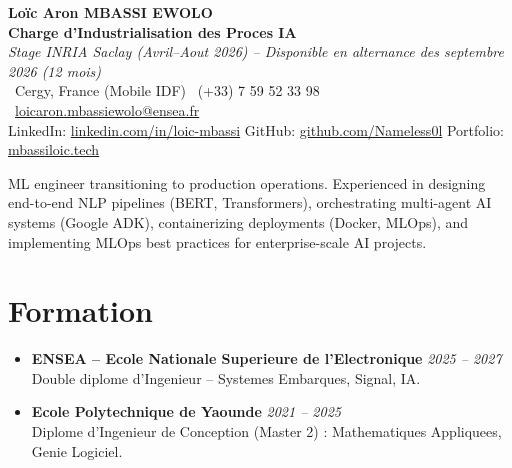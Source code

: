 \documentclass[a4paper,11pt]{article}
\begin{document}
\begin{center}
    {\Large \textbf{Lo\"ic Aron MBASSI EWOLO}} \\ \vspace{4pt}
    \textbf{\large Charge d'Industrialisation des Proces IA} \\
    \textit{\small Stage INRIA Saclay (Avril--Aout 2026) -- Disponible en alternance des septembre 2026 (12 mois)} \\ \vspace{4pt}
    \small
    \Pointinghand\ Cergy, France (Mobile IDF) \quad
    \Mobilefone\ (+33) 7 59 52 33 98 \quad
    {\color{primary}\Letter\ \href{mailto:loicaron.mbassiewolo@ensea.fr}{loicaron.mbassiewolo@ensea.fr}} \\ \vspace{2pt}
    {\color{primary}LinkedIn: \href{https://www.linkedin.com/in/loic-mbassi/}{linkedin.com/in/loic-mbassi}} \quad
    {\color{primary}GitHub: \href{https://github.com/Nameless0l}{github.com/Nameless0l}} \quad
    {\color{primary}Portfolio: \href{https://mbassiloic.tech}{mbassiloic.tech}}
\end{center}

\vspace{-6pt}

\noindent\small{ML engineer transitioning to production operations. Experienced in designing end-to-end NLP pipelines (BERT, Transformers), orchestrating multi-agent AI systems (Google ADK), containerizing deployments (Docker, MLOps), and implementing MLOps best practices for enterprise-scale AI projects.}

\section{Formation}
\begin{itemize}[leftmargin=*, label=\tiny$\bullet$, nosep]
    \item \textbf{ENSEA -- Ecole Nationale Superieure de l'Electronique} \hfill \textit{2025 -- 2027} \\
    \small{Double diplome d'Ingenieur -- Systemes Embarques, Signal, IA.}
    \item \textbf{Ecole Polytechnique de Yaounde} \hfill \textit{2021 -- 2025} \\
    \small{Diplome d'Ingenieur de Conception (Master 2) : Mathematiques Appliquees, Genie Logiciel.}
\end{itemize}
\end{document}
